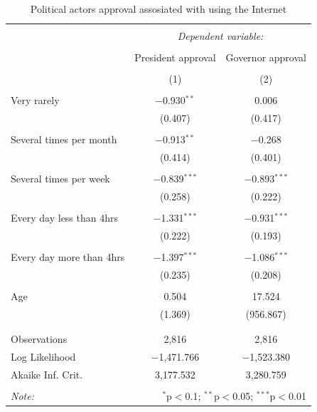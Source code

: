 \documentclass[
  english,
  man]{apa6}
\begin{document}
\begin{table}[!htbp] \centering 
  \caption{Political actors approval assosiated with using the Internet} 
  \label{} 
\small 
\begin{tabular}{@{\extracolsep{5pt}}lcc} 
\\[-1.8ex]\hline 
\hline \\[-1.8ex] 
 & \multicolumn{2}{c}{\textit{Dependent variable:}} \\ 
\cline{2-3} 
\\[-1.8ex] & President approval & Governor approval \\ 
\\[-1.8ex] & (1) & (2)\\ 
\hline \\[-1.8ex] 
 Very rarely & $-$0.930$^{**}$ & 0.006 \\ 
  & (0.407) & (0.417) \\ 
  & & \\ 
 Several times per month & $-$0.913$^{**}$ & $-$0.268 \\ 
  & (0.414) & (0.401) \\ 
  & & \\ 
 Several times per week & $-$0.839$^{***}$ & $-$0.893$^{***}$ \\ 
  & (0.258) & (0.222) \\ 
  & & \\ 
 Every day less than 4hrs & $-$1.331$^{***}$ & $-$0.931$^{***}$ \\ 
  & (0.222) & (0.193) \\ 
  & & \\ 
 Every day more than 4hrs & $-$1.397$^{***}$ & $-$1.086$^{***}$ \\ 
  & (0.235) & (0.208) \\ 
  & & \\ 
 Age & 0.504 & 17.524 \\ 
  & (1.369) & (956.867) \\ 
  & & \\ 
\hline \\[-1.8ex] 
Observations & 2,816 & 2,816 \\ 
Log Likelihood & $-$1,471.766 & $-$1,523.380 \\ 
Akaike Inf. Crit. & 3,177.532 & 3,280.759 \\ 
\hline 
\hline \\[-1.8ex] 
\textit{Note:}  & \multicolumn{2}{r}{$^{*}$p$<$0.1; $^{**}$p$<$0.05; $^{***}$p$<$0.01} \\ 
\end{tabular} 
\end{table}
\end{document}
